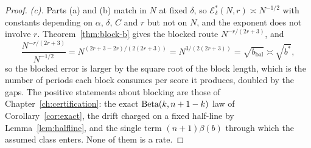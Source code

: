 \documentclass[../../../main.tex]{subfiles}
\begin{document}
\begin{proof}
\emph{(c).} Parts (a) and (b) match in $N$ at fixed $\delta$, so $\mathcal E^*_\delta(N,r)\asymp N^{-1/2}$ with constants depending on $\alpha$, $\delta$, $C$ and $r$ but not on $N$, and the exponent does not involve $r$. Theorem~\ref{thm:block-b} gives the blocked route $N^{-r/(2r+3)}$, and
\[
\frac{N^{-r/(2r+3)}}{N^{-1/2}}=N^{(2r+3-2r)/(2(2r+3))}=N^{3/(2(2r+3))}=\sqrt{b_{\mathrm{bal}}}\asymp\sqrt{b^*} ,
\]
so the blocked error is larger by the square root of the block length, which is the number of periods each block consumes per score it produces, doubled by the gaps. The positive statements about blocking are those of Chapter~\ref{ch:certification}: the exact $\operatorname{Beta}(k,n+1-k)$ law of Corollary~\ref{cor:exact}, the drift charged on a fixed half-line by Lemma~\ref{lem:halfline}, and the single term $(n+1)\beta(b)$ through which the assumed class enters. None of them is a rate.
\end{proof}
\end{document}
